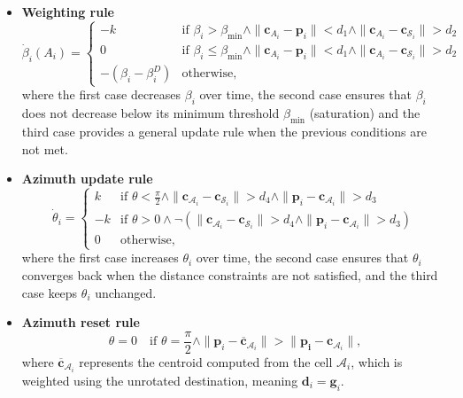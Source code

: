         \begin{itemize}
            \item \textbf{Weighting rule}
                \begin{equation}
                    \label{eqn:beta_weighting}
                    \dot{\beta}_i(A_i) = 
                    \begin{cases}
                        -k & \text{if } \beta_i > \beta_{\min} \land \|\mathbf{c}_{A_i} - \mathbf{p}_i\| < d_1 \land \|\mathbf{c}_{A_i} - \mathbf{c}_{\mathcal{S}_i}\| > d_2  \\
                        0  & \text{if } \beta_i \leq \beta_{\min} \land \|\mathbf{c}_{A_i} - \mathbf{p}_i\| < d_1 \land \|\mathbf{c}_{A_i} - \mathbf{c}_{\mathcal{S}_i}\| > d_2  \\
                        -(\beta_i - \beta_i^D) & \text{otherwise}\text{,}
                    \end{cases}
                \end{equation}
                where the first case decreases $\beta_i$ over time, the second case ensures that $\beta_i$ does not decrease below its minimum threshold $\beta_{\min}$ (saturation) and the third case provides a general update rule when the previous conditions are not met.
            \item \textbf{Azimuth update rule}
                \begin{equation}
                    \label{eqn:azimuth_2d}
                    \dot{\theta}_i = 
                    \begin{cases}
                        k  & \text{if } \theta < \frac{\pi}{2} \land \|\mathbf{c}_{\mathcal{A}_i} - \mathbf{c}_{\mathcal{S}_i}\| > d_4 \land \|\mathbf{p}_i - \mathbf{c}_{\mathcal{A}_i}\| > d_3 \\
                        -k & \text{if } \theta > 0 \land \neg (\|\mathbf{c}_{\mathcal{A}_i} - \mathbf{c}_{\mathcal{S}_i}\| > d_4 \land \|\mathbf{p}_i - \mathbf{c}_{\mathcal{A}_i}\| > d_3) \\
                        0  & \text{otherwise}\text{,}
                    \end{cases}
                \end{equation}
                where the first case increases $\theta_i$ over time, the second case ensures that $\theta_i$ converges back when the distance constraints are not satisfied, and the third case keeps $\theta_i$ unchanged.
            \item \textbf{Azimuth reset rule}
                \begin{equation}
                    \label{eqn:azimuth_reset_2d}
                    \theta = 0 \quad \text{if } \theta = \frac{\pi}{2} \land \| \mathbf{p}_i - \mathbf{\overline{c}}_{\mathcal{A}_i} \| > \| \mathbf{p_i} - \mathbf{c}_{\mathcal{A}_i} \|\text{,}
                \end{equation}
                where $\mathbf{\overline{c}}_{\mathcal{A}_i}$ represents the centroid computed from the cell $\mathcal{A}_i$, which is weighted using the unrotated destination, meaning $\mathbf{d}_i = \mathbf{g}_i$.
        \end{itemize}
